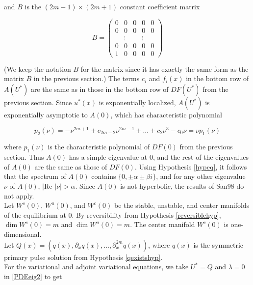 \documentclass[12pt]{article}
\begin{document}
and $B$ is the $(2m +1) \times (2m+1)$ constant coefficient matrix

\begin{equation}\label{DefB}
B = \begin{pmatrix}0 & 0 & 0 & 0 & 0 \\0 & 0 & 0 & 0 & 0 \\  & 
\vdots & & \vdots & \\0 & 0 & 0 & 0 & 0 \\1 & 0 & 0 & 0 & 0 \end{pmatrix} 
\end{equation}

(We keep the notation $B$ for the matrix since it has exactly the same form as the matrix $B$ in the previous section.) The terms $c_i$ and $f_i(x)$ in the bottom row of $A(U^*)$ are the same as in those in the bottom row of $DF(U^*)$ from the previous section. Since $u^*(x)$ is exponentially localized, $A(U^*)$ is exponentially asymptotic to $A(0)$, which has characteristic polynomial

\begin{equation}\label{charpolyDF0}
p_2(\nu) = -\nu^{2m+1} + c_{2m-2} \nu^{2m-1} + \dots + c_2 \nu^3 - c_0 \nu = \nu p_1(\nu)
\end{equation}

where $p_1(\nu)$ is the characteristic polynomial of $DF(0)$ from the previous section. Thus $A(0)$ has a simple eigenvalue at 0, and the rest of the eigenvalues of $A(0)$ are the same as those of $DF(0)$. Using Hypothesis \ref{hypeq}, it follows that the spectrum of $A(0)$ contains $\{ 0, \pm \alpha \pm \beta i\}$, and for any other eigenvalue $\nu$ of $A(0)$, $|\text{Re }|\nu| > \alpha$. Since $A(0)$ is not hyperbolic, the results of San98 do not apply.\\

Let $W^s(0)$, $W^u(0)$, and $W^c(0)$ be the stable, unstable, and center manifolds of the equilibrium at 0. By reversibility from Hypothesis \ref{reversiblehyp}, $\dim W^s(0) = m$ and $\dim W^u(0) = m$. The center manifold $W^c(0)$ is one-dimensional.\\

Let $Q(x) = (q(x), \partial_x q(x), \dots, \partial_x^{2m} q(x))$, where $q(x)$ is the symmetric primary pulse solution from Hypothesis \ref{qexistshyp}.\\

For the variational and adjoint variational equations, we take $U^* = Q$ and $\lambda = 0$ in \eqref{PDEeig2} to get
\end{document}
